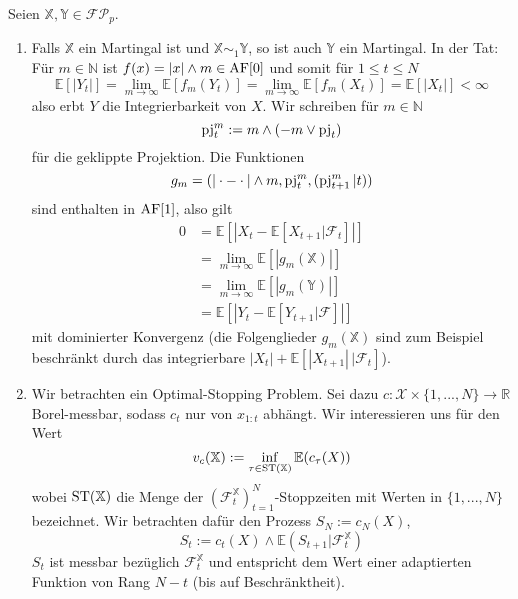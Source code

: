 \begin{example}\label{thm:adapted_examples}
    Seien $\mathbb{X,Y} \in\mathcal{FP}_p$.
    \begin{enumerate}
        \item Falls $\mathbb{X}$ ein Martingal ist und $\mathbb{X}\sim_1 \mathbb{Y}$, so ist auch $\mathbb{Y}$ ein Martingal. In der Tat: Für $m \in \mathbb{N}$ ist $f(x)= |x| \wedge m \in \operatorname{AF}[0]$ und somit für $1\leq t \leq N$
        $$\mathbb{E}[|Y_t|] = \lim_{m\rightarrow\infty}\mathbb{E}[f_m(Y_t)]=\lim_{m\rightarrow\infty}\mathbb{E}[f_m(X_t)] = \mathbb{E}[|X_t|] < \infty$$
        also erbt $Y$ die Integrierbarkeit von $X$. Wir schreiben für $m \in \mathbb{N}$ 
        $$\operatorname{pj}_t^m:=m \wedge (-m \vee \operatorname{pj}_t)$$
         für die geklippte Projektion. Die Funktionen 
         $$g_m = (|\cdot - \cdot |\wedge m, \operatorname{pj}^m_t, (\operatorname{pj}^m_{t+1}\vert t))$$
         sind enthalten in $\operatorname{AF}[1]$, also gilt
         \begin{align*}
            0 &= \mathbb{E}\left[ |X_t - \mathbb{E}[X_{t+1} \vert \mathcal{F}_t]| \right] \\
            &= \lim_{m\rightarrow \infty} \mathbb{E}[|g_m(\mathbb{X})|] \\
            &= \lim_{m\rightarrow\infty} \mathbb{E}[|g_m(\mathbb{Y})|] \\
            &= \mathbb{E}\left[|Y_t - \mathbb{E}[Y_{t+1} \vert \mathcal{F}] |\right]
         \end{align*}
         mit dominierter Konvergenz (die Folgenglieder $g_m(\mathbb{X})$ sind zum Beispiel beschränkt durch das integrierbare $|X_t| + \mathbb{E}[|X_{t+1}| \,\vert \mathcal{F}_t]$).
         \item Wir betrachten ein Optimal-Stopping Problem. Sei dazu $c:\mathcal{X} \times \{1,...,N\}\rightarrow \mathbb{R}$ Borel-messbar, sodass $c_t$ nur von $x_{1:t}$ abhängt. Wir interessieren uns für den Wert 
         $$v_c(\mathbb{X}) := \inf\limits_{\tau \in \operatorname{ST}(\mathbb{X})}\mathbb{E}(c_\tau(X))$$
         wobei $\operatorname{ST}(\mathbb{X})$ die Menge der $\left(\mathcal{F}_t^\mathbb{X}\right)_{t=1}^N$-Stoppzeiten mit Werten in $\{1,...,N\}$ bezeichnet. Wir betrachten dafür den Prozess $S_N:=c_N(X)$, 
         \begin{equation} \label{eq:45_20}
            S_t := c_t(X) \wedge \mathbb{E}(S_{t+1} \vert \mathcal{F}_t^\mathbb{X})
         \end{equation}
         $S_t$ ist messbar bezüglich $\mathcal{F}_t^\mathbb{X}$ und entspricht dem Wert einer adaptierten Funktion von Rang $N-t$ (bis auf Beschränktheit).

\end{enumerate}
\end{example}
